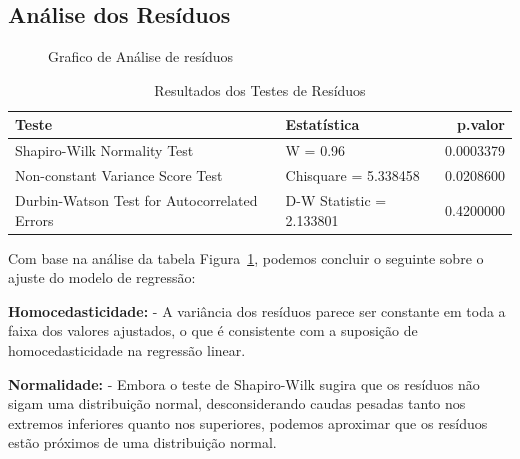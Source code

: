 \documentclass[
  letterpaper,
  DIV=11,
  numbers=noendperiod]{scrreprt}
\begin{document}
\subsection{Análise dos Resíduos}\label{anuxe1lise-dos-resuxedduos}

\begin{figure}

\caption{\label{fig-t3}Grafico de Análise de resíduos}


\end{figure}%

\begin{longtable}[t]{llr}
\caption{\label{tab:unnamed-chunk-14}Resultados dos Testes de Resíduos}\\
\toprule
Teste & Estatística & p.valor\\
\midrule
Shapiro-Wilk Normality Test & W = 0.96 & 0.0003379\\
Non-constant Variance Score Test & Chisquare = 5.338458 & 0.0208600\\
Durbin-Watson Test for Autocorrelated Errors & D-W Statistic = 2.133801 & 0.4200000\\
\bottomrule
\end{longtable}

Com base na análise da tabela Figura~\ref{fig-t3}, podemos concluir o
seguinte sobre o ajuste do modelo de regressão:

\textbf{Homocedasticidade:} - A variância dos resíduos parece ser
constante em toda a faixa dos valores ajustados, o que é consistente com
a suposição de homocedasticidade na regressão linear.

\textbf{Normalidade:} - Embora o teste de Shapiro-Wilk sugira que os
resíduos não sigam uma distribuição normal, desconsiderando caudas
pesadas tanto nos extremos inferiores quanto nos superiores, podemos
aproximar que os resíduos estão próximos de uma distribuição normal.
\end{document}
